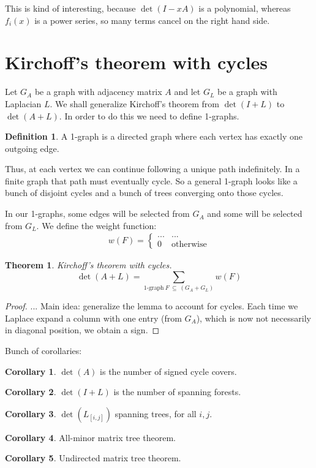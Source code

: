 \documentclass[a4paper, 11pt]{article}
\newtheorem{theorem}{Theorem}[section]
\theoremstyle{definition}
\newtheorem{definition}{Definition}[section]
\newtheorem{corollary}{Corollary}[theorem]
\begin{document}
This is kind of interesting, because $\det(I - xA)$ is a polynomial, whereas $f_i(x)$ is a power series, so many terms cancel on the right hand side.

\section{Kirchoff's theorem with cycles}

Let $G_A$ be a graph with adjacency matrix $A$ and let $G_L$ be a graph with Laplacian $L$. We shall generalize Kirchoff's theorem from $\det(I + L)$ to $\det(A + L)$. In order to do this we need to define 1-graphs.

\begin{definition}
  A 1-graph is a directed graph where each vertex has exactly one outgoing edge.
\end{definition}

Thus, at each vertex we can continue following a unique path indefinitely. In a finite graph that path must eventually cycle. So a general 1-graph looks like a bunch of disjoint cycles and a bunch of trees converging onto those cycles.

In our 1-graphs, some edges will be selected from $G_A$ and some will be selected from $G_L$. We define the weight function:
\begin{align*}
  w(F) = \begin{cases}
    ... & ... \\
    0 & \text{otherwise}
  \end{cases}
\end{align*}

\begin{theorem} Kirchoff's theorem with cycles.
  \[
    \det(A + L) = \sum_{\text{1-graph}\ F\ \subseteq\ (G_A + G_L)} w(F)
  \]
\end{theorem}
\begin{proof}
  ... Main idea: generalize the lemma to account for cycles. Each time we Laplace expand a column with one entry (from $G_A$), which is now not necessarily in diagonal position, we obtain a sign.
\end{proof}

Bunch of corollaries:

\begin{corollary}
  $\det(A)$ is the number of signed cycle covers.
\end{corollary}

\begin{corollary}
  $\det(I + L)$ is the number of spanning forests.
\end{corollary}

\begin{corollary}
  $\det(L_{[i,j]})$ spanning trees, for all $i,j$.
\end{corollary}

\begin{corollary}
  All-minor matrix tree theorem.
\end{corollary}

\begin{corollary}
  Undirected matrix tree theorem.
\end{corollary}
\end{document}
